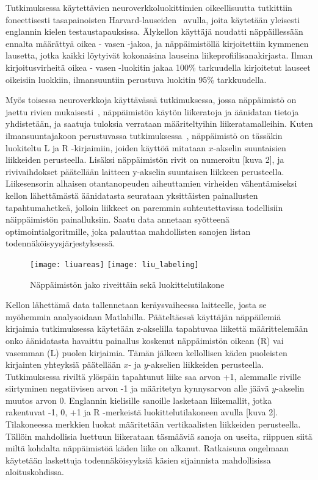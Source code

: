 \documentclass[finnish]{tktltiki2}
\theoremstyle{definition}
\theoremstyle{remark}
\begin{document}
Tutkimuksessa käytettävien neuroverkkoluokittimien oikeellisuutta tutkittiin foneettisesti tasapainoisten Harvard-lauseiden~\cite{har} avulla, joita käytetään yleisesti englannin kielen testaustapauksissa. Älykellon käyttäjä noudatti näppäillessään ennalta määrättyä oikea - vasen -jakoa, ja näppäimistöllä kirjoitettiin kymmenen lausetta, jotka kaikki löytyivät kokonaisina lauseina liikeprofiilisanakirjasta. Ilman kirjoitusvirheitä oikea - vasen -luokitin jakaa 100\% tarkuudella kirjoitetut lauseet oikeisiin luokkiin, ilmansuuntiin perustuva luokitin 95\% tarkkuudella. 

Myös toisessa neuroverkkoja käyttävässä tutkimuksessa, jossa näppäimistö on jaettu rivien mukaisesti~\cite{liu}, näppäimistön käytön liikeratoja ja äänidatan tietoja yhdistetään, ja saatuja tuloksia verrataan määriteltyihin liikeratamalleihin. Kuten ilmansuuntajakoon perustuvassa tutkimuksessa~\cite{maiti}, näppäimistö on tässäkin luokiteltu L ja R -kirjaimiin, joiden käyttöä mitataan $x$-akselin suuntaisien liikkeiden perusteella. Lisäksi näppäimistön rivit on numeroitu [kuva 2], ja rivivaihdokset päätellään laitteen y-akselin suuntaisen liikkeen perusteella. Liikesensorin alhaisen otantanopeuden aiheuttamien virheiden vähentämiseksi kellon lähettämästä äänidatasta seurataan yksittäisten painallusten tapahtumahetkeä, jolloin liikkeet on paremmin suhteutettavissa todellisiin näippäimistön painalluksiin. Saatu data annetaan syötteenä optimointialgoritmille, joka palauttaa mahdollisten sanojen listan todennäköisyysjärjestyksessä. 

\begin{figure}[!b]
\begin{floatrow}
\texttt{[image: liuareas]}
\texttt{[image: liu\_labeling]}
\caption{Näppäimistön jako riveittäin sekä luokittelutilakone}
\end{floatrow}
\label{fig:liuareas}
\end{figure}

Kellon lähettämä data tallennetaan keräysvaiheessa laitteelle, josta se myöhemmin analysoidaan Matlabilla. Pääteltäessä käyttäjän näppäilemiä kirjaimia tutkimuksessa käytetään z-akselilla tapahtuvaa liikettä määrittelemään onko äänidatasta havaittu painallus koskenut näppäimistön oikean (R) vai vasemman (L) puolen kirjaimia. Tämän jälkeen kellollisen käden puoleisten kirjainten yhteyksiä päätellään $x$- ja $y$-akselien liikkeiden perusteella. Tutkimuksessa riviltä ylöspäin tapahtunut liike saa arvon +1, alemmalle riville siirtyminen negatiivisen arvon -1 ja määritetyn kynnysarvon alle jäävä $y$-akselin muutos arvon 0. Englannin kielisille sanoille lasketaan liikemallit, jotka rakentuvat -1, 0, +1 ja R -merkeistä luokittelutilakoneen avulla [kuva 2]. Tilakoneessa merkkien luokat määritetään vertikaalisten liikkeiden perusteella. Tällöin mahdollisia luettuun liikerataan täsmääviä sanoja on useita, riippuen siitä miltä kohdalta näppäimistöä käden liike on alkanut. Ratkaisuna ongelmaan käytetään laskettuja todennäköisyyksiä käsien sijainnista mahdollisissa aloituskohdissa.
\end{document}
